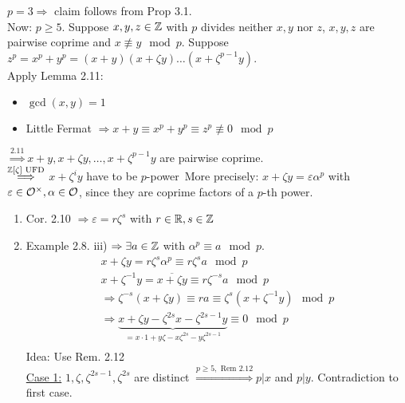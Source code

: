 \begin{Bew}[of Thm. 1]
$p=3 \Rightarrow $ claim follows from Prop 3.1.\\
Now: $p \geq 5$. Suppose $x,y,z \in \mathbb{Z}$ with $p$ divides neither $x,y$ nor $z$, $x,y,z$ are pairwise coprime and $x \not\equiv y \mod p$. Suppose $z^p = x^p +y^p=(x+y)(x+\zeta y)\dots (x+\zeta^{p-1}y)$.\\
Apply Lemma 2.11:
\begin{itemize}
\item $\gcd(x,y)=1$ \checkmark
\item Little Fermat $\Rightarrow x+y \equiv x^p+y^p\equiv z^p \not \equiv 0 \mod p$
\end{itemize}
$\stackrel{2.11}{\Longrightarrow} x+y, x+\zeta y, \dots, x+\zeta^{p-1}y$ are pairwise coprime.\\
$\stackrel{\mathbb{Z}[\zeta] \text{ UFD}}{\Longrightarrow}$ \glqq $x+\zeta^i y$ have to be $p$-power\grqq \ More precisely: $x+\zeta y = \varepsilon \alpha^p$ with $\varepsilon \in \mathcal{O}^\times, \alpha \in \mathcal{O}$, since they are coprime factors of a $p$-th power.
\begin{enumerate}
\item Cor. 2.10 $\Rightarrow \varepsilon = r \zeta^s$ with $r \in \mathbb{R}, s \in \mathbb{Z}$
\item Example 2.8. iii) $\Rightarrow \exists a \in \mathbb{Z}$ with $\alpha^p \equiv a \mod p$.
\begin{align*}
x + \zeta y = r \zeta^s \alpha^p \equiv r \zeta^s a \mod p\\
x+ \zeta^{-1} y = \overline{x+ \zeta y} \equiv r \zeta^{-s}a \mod p\\
\Rightarrow \zeta^{-s}(x+\zeta y) \equiv ra \equiv \zeta^s(x+\zeta^{-1}y) \mod p\\
\Rightarrow \underbrace{x+\zeta y - \zeta^{2s}x- \zeta^{2s-1}y}_{=x\cdot 1 + y \zeta -x \zeta^{2s} - y \zeta^{2s-1}} \equiv 0 \mod p\\
\end{align*}
Idea: Use Rem. 2.12\\
\underline{Case 1:} $1, \zeta, \zeta^{2s-1}, \zeta^{2s}$ are distinct $\stackrel{p \geq 5, \text{ Rem 2.12}}{\Longrightarrow} p | x$ and $p | y$.  Contradiction to first case.
\end{enumerate}
\end{Bew}